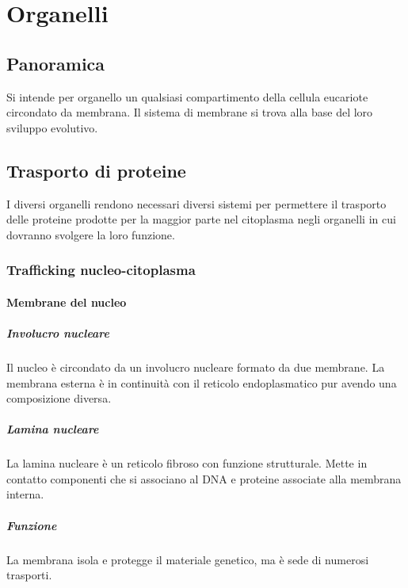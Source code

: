 \chapter{Organelli}

\section{Panoramica}
Si intende per organello un qualsiasi compartimento della cellula eucariote circondato da membrana.
Il sistema di membrane si trova alla base del loro sviluppo evolutivo.

\section{Trasporto di proteine}
I diversi organelli rendono necessari diversi sistemi per permettere il trasporto delle proteine prodotte per la maggior parte nel citoplasma negli organelli in cui dovranno svolgere la loro funzione.

	\subsection{Trafficking nucleo-citoplasma}
	
		\subsubsection{Membrane del nucleo}
		
			\paragraph{Involucro nucleare}
			Il nucleo \`e circondato da un involucro nucleare formato da due membrane.
			La membrana esterna \`e in continuit\`a con il reticolo endoplasmatico pur avendo una composizione diversa.

			\paragraph{Lamina nucleare}
			La lamina nucleare \`e un reticolo fibroso con funzione strutturale.
			Mette in contatto componenti che si associano al DNA e proteine associate alla membrana interna.

			\paragraph{Funzione}
			La membrana isola e protegge il materiale genetico, ma \`e sede di numerosi trasporti.

